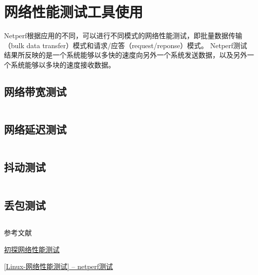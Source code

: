 \documentclass[a4paper,left=1.5cm,right=1.5cm,11pt]{article}
\def\hang{\hangindent\parindent}
\def\textindent#1{\indent\llap{#1\enspace}\ignorespaces}
\def\re{\par\hang\textindent}
\begin{document}
\section{网络性能测试工具使用}
Netperf根据应用的不同，可以进行不同模式的网络性能测试，即批量数据传输（bulk data transfer）模式和请求/应答（request/reponse）模式。
Netperf测试结果所反映的是一个系统能够以多快的速度向另外一个系统发送数据，以及另外一个系统能够以多块的速度接收数据。
\subsection{网络带宽测试}
\begin{lstlisting}

\end{lstlisting}
\subsection{网络延迟测试}
\begin{lstlisting}

\end{lstlisting}
\subsection{抖动测试}
\begin{lstlisting}

\end{lstlisting}
\subsection{丢包测试}
\begin{lstlisting}

\end{lstlisting}
 
\clearpage
\begin{center}%
参考文献
\end{center}
\re{[1]} \href{http://www.2cto.com/net/201310/253951.html}{初探网络性能测试} 
\re{[2]} \href{http://www.jianshu.com/p/42e0fa6bf79c}{[Linux-网络性能测试] -- netperf测试}
\end{document}
